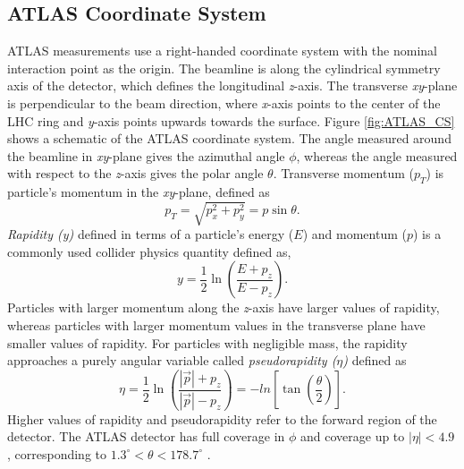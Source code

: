 \subsection{ATLAS Coordinate System}
\label{subsec:ATLASCS}

ATLAS measurements use a right-handed coordinate system with the nominal interaction point as the origin. The beamline is along the cylindrical symmetry axis of the detector, which defines the longitudinal \textit{z}-axis. The transverse \textit{xy}-plane is perpendicular to the beam direction, where \textit{x}-axis points to the center of the LHC ring and \textit{y}-axis points upwards towards the surface. Figure \ref{fig:ATLAS_CS} shows a schematic of the ATLAS coordinate system. The angle measured around the beamline in \textit{xy}-plane gives the azimuthal angle $\phi$, whereas the angle measured with respect to the \textit{z}-axis gives the polar angle $\theta$. Transverse momentum ($p_{T}$) is particle's momentum in the \textit{xy}-plane, defined as 
\begin{equation}
p_{T} = \sqrt{p_{x}^2+p_{y}^2}=p\sin\theta.
\label{eqn:pT}
\end{equation}
\textit{Rapidity (y)} defined in terms of a particle's energy ($E$) and momentum ($p$) is a commonly used collider physics quantity defined as, 
\begin{equation}
    y = \frac{1}{2}\ln{ \left( \frac{E+p_{z}}{E-p_{z}} \right) }.
    \label{eqn:Rapidity}
\end{equation}
Particles with larger momentum along the \textit{z}-axis have larger values of rapidity, whereas particles with larger momentum values in the transverse plane have smaller values of rapidity. For particles with negligible mass, the rapidity approaches a purely angular variable called \textit{pseudorapidity ($\eta$)} defined as
\begin{equation}
    \eta = \frac{1}{2}\ln{ \left( \frac{ |\vec{p}|+p_{z}}{ |\vec{p}| -p_{z}} \right) } = -ln { \left[ \tan \left( \frac{\theta}{2}\right) \right] }. 
    \label{eqn:PseudoRapidity}
\end{equation}
Higher values of rapidity and pseudorapidity refer to the forward region of the detector. The ATLAS detector has full coverage in $\phi$ and coverage up to $|\eta| < 4.9$, corresponding to $1.3^{\circ} < \theta < 178.7^{\circ} $ \cite{ATLAS}. 

